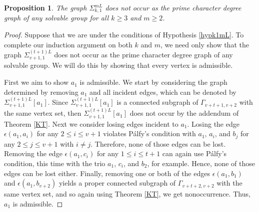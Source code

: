 \documentclass[11pt]{amsart}
\newtheorem{proposition}[theorem]{Proposition}
\theoremstyle{definition}
\theoremstyle{remark}
\numberwithin{equation}{section}
\newcommand{\SLi}[3]{\Sigma_{#1,#2}^{#3L}} %
\begin{document}
\begin{proposition}\label{propk1mL}
The graph $\SLi{k}{1}{m}$ does not occur as the prime character degree graph of any solvable group for all $k\geq3$ and $m\geq2$.
\end{proposition}
\begin{proof}
Suppose that we are under the conditions of Hypothesis \ref{hypk1mL}. To complete our induction argument on both $k$ and $m$, we need only show that the graph $\SLi{v+1}{1}{(t+1)}$ does not occur as the prime character degree graph of any solvable group. We will do this by showing that every vertex is admissible.

First we aim to show $a_1$ is admissible. We start by considering the graph determined by removing $a_1$ and all incident edges, which can be denoted by $\SLi{v+1}{1}{(t+1)}[a_1]$. Since $\SLi{v+1}{1}{(t+1)}[a_1]$ is a connected subgraph of $\Gamma_{v+t+1,v+2}$ with the same vertex set, then $\SLi{v+1}{1}{(t+1)}[a_1]$ does not occur by the addendum of Theorem \ref{KT}. Next we consider losing edges incident to $a_1$. Losing the edge $\epsilon(a_1,a_i)$ for any $2\leq i\leq v+1$ violates P\'alfy's condition with $a_1$, $a_i$, and $b_j$ for any $2\leq j\leq v+1$ with $i\neq j$. Therefore, none of those edges can be lost. Removing the edge $\epsilon(a_1,c_i)$ for any $1\leq i\leq t+1$ can again use P\'alfy's condition, this time with the trio $a_1$, $c_i$, and $b_2$, for example. Hence, none of those edges can be lost either. Finally, removing one or both of the edges $\epsilon(a_1,b_1)$ and $\epsilon(a_1,b_{v+2})$ yields a proper connected subgraph of $\Gamma_{v+t+2,v+2}$ with the same vertex set, and so again using Theorem \ref{KT}, we get nonoccurrence. Thus, $a_1$ is admissible.


\end{proof}
\end{document}
